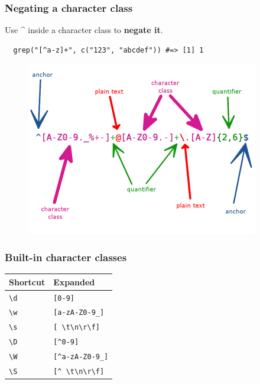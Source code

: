 \documentclass{beamer}
\begin{document}
\begin{frame}[fragile]
  \frametitle{Negating a character class}
  Use \^{} inside a character class to \textbf{negate it}.
  \vspace{3mm}

\begin{verbatim}
  grep("[^a-z]+", c("123", "abcdef")) #=> [1] 1
\end{verbatim}
\end{frame}
\begin{frame}
  \begin{figure}[h]
    \centering
    \includegraphics[width=4in]{"email-regexp"}
  \end{figure}
\end{frame}
\begin{frame}
  \frametitle{Built-in character classes}
  \begin{tabular}{|l|l|}
    \hline \textbf{Shortcut} & \textbf{Expanded} \\
    \hline \texttt{\textbackslash d} & \texttt{[0-9]} \\
    \hline \texttt{\textbackslash w} & \texttt{[a-zA-Z0-9\_]} \\
    \hline \texttt{\textbackslash s} & \texttt{[ \textbackslash t\textbackslash n\textbackslash r\textbackslash f]} \\
    \hline \texttt{\textbackslash D} & \texttt{[\textasciicircum 0-9]} \\
    \hline \texttt{\textbackslash W} & \texttt{[\textasciicircum a-zA-Z0-9\_]} \\
    \hline \texttt{\textbackslash S} & \texttt{[\textasciicircum \ \textbackslash t\textbackslash n\textbackslash r\textbackslash f]} \\
    \hline
  \end{tabular}
\end{frame}
\end{document}

